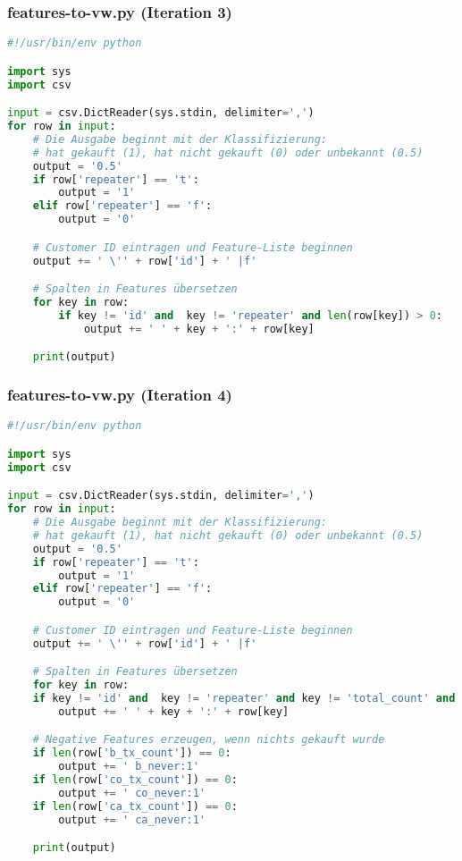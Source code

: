 \subsubsection{features-to-vw.py (Iteration 3)}
\label{code:features-to-vw}
\begin{lstlisting}[language=Python]
#!/usr/bin/env python

import sys
import csv

input = csv.DictReader(sys.stdin, delimiter=',')
for row in input:
	# Die Ausgabe beginnt mit der Klassifizierung:
	# hat gekauft (1), hat nicht gekauft (0) oder unbekannt (0.5)
	output = '0.5'
	if row['repeater'] == 't':
		output = '1'
	elif row['repeater'] == 'f':
		output = '0'

	# Customer ID eintragen und Feature-Liste beginnen
	output += ' \'' + row['id'] + ' |f'

	# Spalten in Features übersetzen
	for key in row:
		if key != 'id' and  key != 'repeater' and len(row[key]) > 0:
			output += ' ' + key + ':' + row[key]

	print(output)
\end{lstlisting}

\subsubsection{features-to-vw.py (Iteration 4)}
\label{code:features-to-vw-4}
\begin{lstlisting}[language=Python]
#!/usr/bin/env python

import sys
import csv

input = csv.DictReader(sys.stdin, delimiter=',')
for row in input:
    # Die Ausgabe beginnt mit der Klassifizierung:
    # hat gekauft (1), hat nicht gekauft (0) oder unbekannt (0.5)
    output = '0.5'
    if row['repeater'] == 't':
        output = '1'
    elif row['repeater'] == 'f':
        output = '0'

    # Customer ID eintragen und Feature-Liste beginnen
    output += ' \'' + row['id'] + ' |f'

    # Spalten in Features übersetzen
    for key in row:
    if key != 'id' and  key != 'repeater' and key != 'total_count' and key != 'total_spent' and len(row[key]) > 0:
        output += ' ' + key + ':' + row[key]

    # Negative Features erzeugen, wenn nichts gekauft wurde
    if len(row['b_tx_count']) == 0:
        output += ' b_never:1'
    if len(row['co_tx_count']) == 0:
        output += ' co_never:1'
    if len(row['ca_tx_count']) == 0:
        output += ' ca_never:1'

    print(output)
\end{lstlisting}


